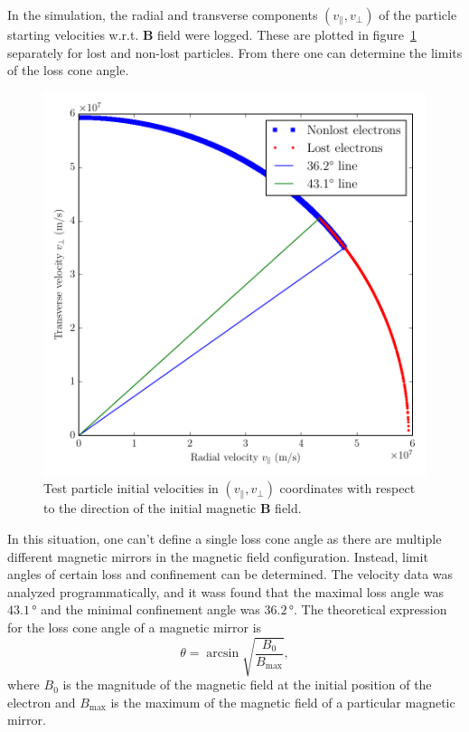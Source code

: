 \documentclass[12pt, a4paper]{article}
\begin{document}
In the simulation, the radial and transverse components $(v_\parallel, v_\perp)$ of the particle starting velocities w.r.t. $\mathbf{B}$ field were logged. These are plotted in figure~\ref{fig:vel} separately for lost and non-lost particles. From there one can determine the limits of the loss cone angle.
\begin{figure}
    \centering
    \includegraphics{output/loss_cone.pdf}
    \caption{Test particle initial velocities in $(v_\parallel, v_\perp)$ coordinates with respect to the direction of the initial magnetic $\mathbf{B}$ field.}
    \label{fig:vel}
\end{figure}
In this situation, one can't define a single loss cone angle as there are multiple different magnetic mirrors in the magnetic field configuration. Instead, limit angles of certain loss and confinement can be determined. The velocity data was analyzed programmatically, and it wass found that the maximal loss angle was $43.1\,\si{\degree}$ and the minimal confinement angle was $36.2\,\si{\degree}$. The theoretical expression for the loss cone angle of a magnetic mirror is
\begin{equation}
    \label{eq:losscone}
    \theta = \arcsin{\sqrt{\frac{B_0}{B_\text{max}}}},
\end{equation}
where $B_0$ is the magnitude of the magnetic field at the initial position of the electron and $B_\text{max}$ is the maximum of the magnetic field of a particular magnetic mirror.
\end{document}

